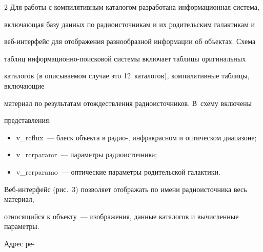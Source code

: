 \begin{multicols}{2}
      Для работы с компилятивным каталогом разработана информационная система, 

включающая базу данных по радиоисточникам и их родительским галактикам и 

      веб-ин\-тер\-фейс для отображения разнообразной информации об объектах. Схема 

таб\-лиц ин\-фор\-ма\-ци\-он\-но-по\-иско\-вой сис\-те\-мы включает таблицы оригинальных 

каталогов (в опи\-сы\-ва\-емом случае это 12~каталогов), компилятивные таб\-ли\-цы, вклю\-ча\-ющие 

материал по результатам отож\-де\-ст\-вле\-ния радиоисточников. В~схему включены 

представления: 

      \begin{itemize}

\item v\_rcflux~--- блеск объекта в радио-, инфракрасном и оптическом диапазоне; 

\item v\_rcrparamr~--- параметры радиоисточника; 

\item v\_rcrparamo~--- оптические параметры родительской галактики.

\end{itemize}







Веб-ин\-тер\-фейс (рис.~3) позволяет отображать по имени радиоисточника весь материал, 

относящийся к объекту~--- изображения, данные каталогов и вычисленные па\-ра\-мет\-ры. 

Адрес ре-\linebreak\vspace*{-12pt}



\pagebreak



\end{multicols}



